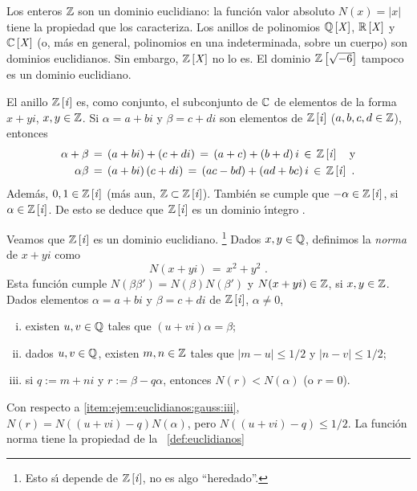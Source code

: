 \begin{ejemEuclidianos}\label{ejem:euclidianos}
	Los enteros $\mathbb{Z}$ son un dominio euclidiano: la funci\'on
	valor absoluto $N(x)=|x|$ tiene la propiedad que los caracteriza.
	Los anillos de polinomios ${\mathbb{Q}}\left[\mathit{X}\right]$,
	${\mathbb{R}}\left[\mathit{X}\right]$ y ${\mathbb{C}}\left[\mathit{X}\right]$ (o, m\'as en
	general, polinomios en una indeterminada, sobre un cuerpo) son
	dominios euclidianos. Sin embargo, ${\mathbb{Z}}\left[\mathit{X}\right]$ no lo es.
	El dominio ${\mathbb{Z}}\left[\sqrt{-6}\right]$ tampoco es un dominio
	euclidiano.
\end{ejemEuclidianos}

\begin{ejemEuclidianos}\label{ejem:euclidianos:gauss}
	El anillo ${\mathbb{Z}}\left[\mathit i\right]$ es, como conjunto, el subconjunto
	de $\mathbb{C}$ de elementos de la forma $x+yi$, $x,y\in\mathbb{Z}$.
	Si $\alpha=a+bi$ y $\beta=c+di$ son elementos de
	${\mathbb{Z}}\left[\mathit i\right]$ ($a,b,c,d\in\mathbb{Z}$), entonces
	\begin{displaymath}
		\begin{aligned}
			\alpha+\beta & \,=\,(a+bi)+(c+di)\,=\,(a+c)+(b+d)\,i
				\,\in\,{\mathbb{Z}}\left[\mathit i\right]\quad\text{y} \\
			\alpha\beta & \,=\,(a+bi)\,(c+di)\,=\,
				(ac-bd)+(ad+bc)\,i
				\,\in\,{\mathbb{Z}}\left[\mathit i\right]
			\text{ .}
		\end{aligned}
	\end{displaymath}
	Adem\'as, $0,1\in{\ensuremath{\mathbb{Z}}}\left[\mathit i\right]$ (m\'as aun,
	$\mathbb{Z}\subset{\ensuremath{\mathbb{Z}}}\left[\mathit i\right]$). Tambi\'en se cumple que
	$-\alpha\in{\ensuremath{\mathbb{Z}}}\left[\mathit i\right]$, si $\alpha\in{\ensuremath{\mathbb{Z}}}\left[\mathit i\right]$.
	De esto se deduce que ${\mathbb{Z}}\left[\mathit i\right]$ es un dominio \'{\i}ntegro
	\quedacomoejercicio.%

	Veamos que ${\mathbb{Z}}\left[\mathit i\right]$ es un dominio euclidiano.%
	\footnote{
		Esto s\'{\i} depende de ${\mathbb{Z}}\left[\mathit i\right]$, no es algo
		``heredado''.
	}
	Dados $x,y\in\mathbb{Q}$, definimos la \emph{norma} de $x+yi$
	como
	\begin{displaymath}
		N(x+yi)\,=\,x^2+y^2
		\text{ .}
	\end{displaymath}
	Esta funci\'on cumple $N(\beta\beta')=N(\beta)N(\beta')$ y
	$N(x+yi)\in\mathbb{Z}$, si $x,y\in\mathbb{Z}$.
	Dados elementos $\alpha=a+bi$ y $\beta=c+di$ de ${\mathbb{Z}}\left[\mathit i\right]$,
	$\alpha\neq 0$,
	\begin{enumerate}[(i)]
		\item\label{item:ejem:euclidianos:gauss:i}
			existen $u,v\in\mathbb{Q}$ tales que
			$(u+vi)\alpha=\beta$;
		\item\label{item:ejem:euclidianos:gauss:ii}
			dados $u,v\in\mathbb{Q}$, existen $m,n\in\mathbb{Z}$
			tales que $|m-u|\leq 1/2$ y $|n-v|\leq 1/2$;
		\item\label{item:ejem:euclidianos:gauss:iii}
			si $q:=m+ni$ y $r:=\beta-q\alpha$, entonces
			$N(r)<N(\alpha)$ (o $r=0$).
	\end{enumerate}
	Con respecto a \eqref{item:ejem:euclidianos:gauss:iii},
	$N(r)=N((u+vi)-q)N(\alpha)$, pero $N((u+vi)-q)\leq 1/2$. La funci\'on
	norma tiene la propiedad de la ~\ref{def:euclidianos}
\end{ejemEuclidianos}

